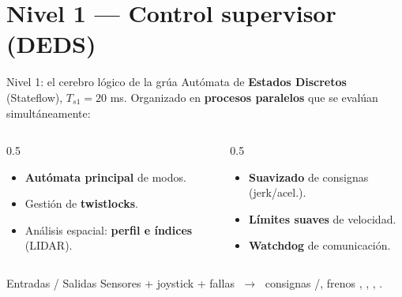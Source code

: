 \section{Nivel 1 --- Control supervisor (DEDS)}

\begin{frame}{Nivel 1: el cerebro lógico de la grúa}
  Autómata de \textbf{Estados Discretos} (Stateflow), $T_{s1}=20$ ms. Organizado en
  \textbf{procesos paralelos} que se evalúan simultáneamente:
  \begin{columns}[T]
    \begin{column}{0.5\textwidth}
      \begin{itemize}
        \item \textbf{Autómata principal} de modos.
        \item Gestión de \textbf{twistlocks}.
        \item Análisis espacial: \textbf{perfil e índices} (LIDAR).
      \end{itemize}
    \end{column}
    \begin{column}{0.5\textwidth}
      \begin{itemize}
        \item \textbf{Suavizado} de consignas (jerk/acel.).
        \item \textbf{Límites suaves} de velocidad.
        \item \textbf{Watchdog} de comunicación.
      \end{itemize}
    \end{column}
  \end{columns}
  \vspace{0.2cm}
  \begin{alertblock}{Entradas / Salidas}
    Sensores + joystick + fallas $\;\to\;$ consignas /, frenos
    , , , .
  \end{alertblock}
\end{frame}

